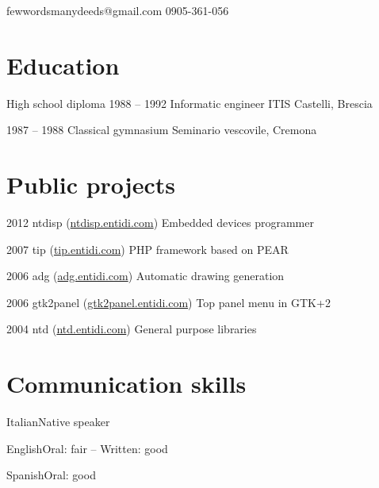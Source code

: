 \documentclass{tccv}
\begin{document}
\personal
    {fewwordsmanydeeds@gmail.com}
    {0905-361-056}
    {}
    {}

\section{Education}

\begin{yearlist}

\item[High school diploma]{1988 -- 1992}
     {Informatic engineer}
     {ITIS Castelli, Brescia}

\item{1987 -- 1988}
     {Classical gymnasium}
     {Seminario vescovile, Cremona}

\end{yearlist}

\section{Public projects}

\begin{yearlist}

\item{2012}
     {ntdisp (\href{http://ntdisp.entidi.com/}{ntdisp.entidi.com})}
     {Embedded devices programmer}

\item{2007}
     {tip (\href{http://tip.entidi.com/}{tip.entidi.com})}
     {PHP framework based on PEAR}

\item{2006}
     {adg (\href{http://adg.entidi.com/}{adg.entidi.com})}
     {Automatic drawing generation}

\item{2006}
     {gtk2panel (\href{http://gtk2panel.entidi.com/}{gtk2panel.entidi.com})}
     {Top panel menu in GTK+2}

\item{2004}
     {ntd (\href{http://ntd.entidi.com/}{ntd.entidi.com})}
     {General purpose libraries}

\end{yearlist}

\section{Communication skills}

\begin{factlist}
\item{Italian}{Native speaker}
\item{English}{Oral: fair -- Written: good}
\item{Spanish}{Oral: good}
\end{factlist}
\end{document}
